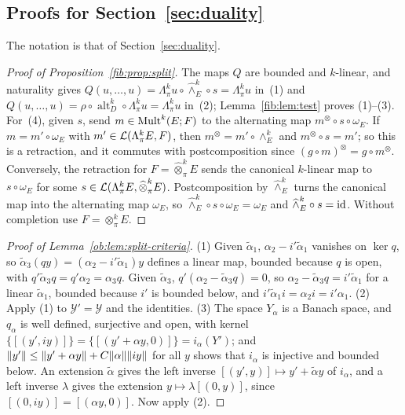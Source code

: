 \subsection{Proofs for Section~\ref{sec:duality}}\label{dfr:ssec:duality}

The notation is that of Section~\ref{sec:duality}.

\begin{proof}[Proof of Proposition~\ref{fib:prop:split}]
The maps $Q$ are bounded and $k$\nobreakdash-linear, and naturality gives
$Q(u,\dots,u)=\Lambda^k_\pi u\circ\widehat\wedge^k_E\circ s=\Lambda^k_\pi u$ in~(1) and
$Q(u,\dots,u)=\rho\circ\operatorname{alt}^k_D\circ\Lambda^k_\pi u=\Lambda^k_\pi u$ in~(2); Lemma~\ref{fib:lem:test}
proves (1)--(3). For~(4), given $s$, send $m\in\operatorname{Mult}^k(E;F)$ to the alternating map $m^\otimes\circ s\circ\omega_E$. If
$m=m'\circ\omega_E$ with $m'\in\mathcal L(\Lambda^k_\pi E,F)$, then $m^\otimes=m'\circ\wedge^k_E$ and $m^\otimes\circ s=m'$; so
this is a retraction, and it commutes with postcomposition since $(g\circ m)^\otimes=g\circ m^\otimes$. Conversely, the
retraction for $F=\widehat\otimes^k_\pi E$ sends the canonical $k$\nobreakdash-linear map to $s\circ\omega_E$ for some
$s\in\mathcal L(\Lambda^k_\pi E,\widehat\otimes^k_\pi E)$. Postcomposition by $\widehat\wedge^k_E$ turns the canonical map into
the alternating map $\omega_E$, so $\widehat\wedge^k_E\circ s\circ\omega_E=\omega_E$ and $\widehat\wedge^k_E\circ s=\mathrm{id}$. Without completion use
$F=\otimes^k_\pi E$.
\end{proof}

\begin{proof}[Proof of Lemma~\ref{ob:lem:split-criteria}]
(1) Given $\tilde\alpha_1$, $\alpha_2-i'\tilde\alpha_1$ vanishes on $\ker q$, so
$\tilde\alpha_3(qy)=(\alpha_2-i'\tilde\alpha_1)y$ defines a linear map, bounded because $q$ is open, with
$q'\tilde\alpha_3q=q'\alpha_2=\alpha_3q$. Given $\tilde\alpha_3$, $q'(\alpha_2-\tilde\alpha_3q)=0$, so
$\alpha_2-\tilde\alpha_3q=i'\tilde\alpha_1$ for a linear $\tilde\alpha_1$, bounded because $i'$ is bounded below, and
$i'\tilde\alpha_1i=\alpha_2i=i'\alpha_1$. (2) Apply (1) to $\mathcal Y'=\mathcal Y$ and the identities. (3) The space
$Y_\alpha$ is a Banach space, and $q_\alpha$ is well defined, surjective and open, with kernel
$\{[(y',iy)]\}=\{[(y'+\alpha y,0)]\}=i_\alpha(Y')$; and $\lVert y'\rVert\le\lVert y'+\alpha y\rVert+C\lVert \alpha\rVert\lVert iy\rVert$ for all $y$
shows that $i_\alpha$ is injective and bounded below. An extension $\tilde\alpha$ gives the left inverse
$[(y',y)]\mapsto y'+\tilde\alpha y$ of $i_\alpha$, and a left inverse $\lambda$ gives the extension $y\mapsto\lambda[(0,y)]$, since $[(0,iy)]=[(\alpha y,0)]$. Now apply (2).
\end{proof}

